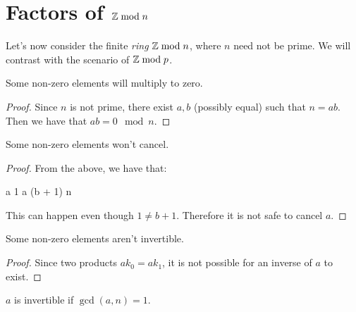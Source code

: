 \section{Factors of $\mathbb{Z} \bmod n$}

Let's now consider the finite \emph{ring} $\mathbb{Z} \bmod n$, where $n$ need not
be prime. We will contrast with the scenario of $\mathbb{Z} \bmod p$.

\begin{lemma}
  Some non-zero elements will multiply to zero.
\end{lemma}

\begin{proof}
  Since $n$ is not prime, there exist $a, b$ (possibly equal) such that
  $n = ab$. Then we have that $ab = 0 \mod n$.
\end{proof}

\begin{lemma}
  Some non-zero elements won't cancel.
\end{lemma}

\begin{proof}
  From the above, we have that:

  \begin{nedqn}
    a 1
  \eqcol
    a (b + 1) \mod n
  \end{nedqn}

  This can happen even though $1 \ne b + 1$. Therefore it is not safe to
  cancel $a$.
\end{proof}

\begin{lemma}
  Some non-zero elements aren't invertible.
\end{lemma}

\begin{proof}
  Since two products $ak_0 = ak_1$, it is not possible for an inverse of
  $a$ to exist.
\end{proof}

\begin{lemma}
  $a$ is invertible if $\gcd(a, n) = 1$.
\end{lemma}

